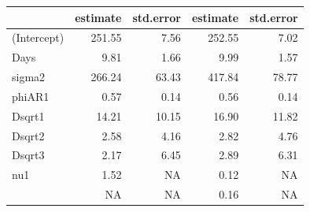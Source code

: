 \documentclass[
  ignorenonframetext,
]{beamer}
\newenvironment{Shaded}{\begin{snugshade}}{\end{snugshade}}
\newcommand{\DataTypeTok}[1]{\textcolor[rgb]{0.13,0.29,0.53}{#1}}
\newcommand{\DecValTok}[1]{\textcolor[rgb]{0.00,0.00,0.81}{#1}}
\newcommand{\KeywordTok}[1]{\textcolor[rgb]{0.13,0.29,0.53}{\textbf{#1}}}
\newcommand{\NormalTok}[1]{#1}
\newcommand{\OperatorTok}[1]{\textcolor[rgb]{0.81,0.36,0.00}{\textbf{#1}}}
\newcommand{\OtherTok}[1]{\textcolor[rgb]{0.56,0.35,0.01}{#1}}
\newcommand{\StringTok}[1]{\textcolor[rgb]{0.31,0.60,0.02}{#1}}
\begin{document}
\begin{frame}[fragile]

\scriptsize

\begin{Shaded}
\end{Shaded}

\begin{longtable}[]{@{}lrrrr@{}}
\toprule
& estimate & std.error & estimate & std.error\tabularnewline
\midrule
\endhead
(Intercept) & 251.55 & 7.56 & 252.55 & 7.02\tabularnewline
Days & 9.81 & 1.66 & 9.99 & 1.57\tabularnewline
sigma2 & 266.24 & 63.43 & 417.84 & 78.77\tabularnewline
phiAR1 & 0.57 & 0.14 & 0.56 & 0.14\tabularnewline
Dsqrt1 & 14.21 & 10.15 & 16.90 & 11.82\tabularnewline
Dsqrt2 & 2.58 & 4.16 & 2.82 & 4.76\tabularnewline
Dsqrt3 & 2.17 & 6.45 & 2.89 & 6.31\tabularnewline
nu1 & 1.52 & NA & 0.12 & NA\tabularnewline
& NA & NA & 0.16 & NA\tabularnewline
\bottomrule
\end{longtable}

\end{frame}
\end{document}
